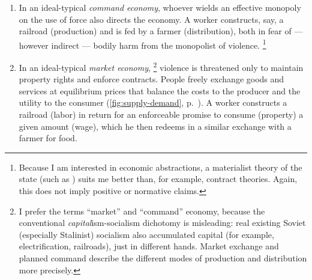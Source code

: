 \begin{enumerate}
	\item
		In an ideal-typical \cite{Weber-1920-aa} \emph{command economy}, whoever wields an effective monopoly on the use of force also directs the economy.
		A worker constructs, say, a railroad (production) and is fed by a farmer (distribution), both in fear of --- however indirect --- bodily harm from the monopolist of violence.
		\footnote{
			Because I am  interested in economic abstractions, a materialist theory of the state (such as \citealt{Tilly-1985-aa}) suits me better than, for example, contract theories.
			Again, this does not imply positive or normative claims.
		}
	\item
		In an ideal-typical \emph{market economy},
		\footnote{
			I prefer the terms ``market'' and ``command'' economy, because the conventional \emph{capital}ism-socialism dichotomy is misleading:
			real existing Soviet (especially Stalinist) socialism also accumulated capital (for example, electrification, railroads), just in different hands.
			Market exchange and planned command describe the different modes of production and distribution more precisely.
		}
		violence is threatened only to maintain property rights and enforce contracts.
			People freely exchange goods and services at equilibrium prices that balance the costs to the producer and the utility to the consumer (\autoref{fig:supply-demand}, p.~\pageref{fig:supply-demand}).
			 A worker constructs a railroad (labor) in return for an enforceable promise to consume (property) a given amount (wage), which he then redeems in a similar exchange with a farmer for food.
\end{enumerate}

